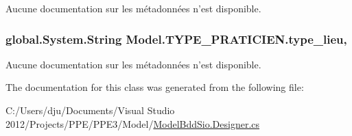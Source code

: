 Aucune documentation sur les métadonnées n'est disponible. 

\hypertarget{class_model_1_1_t_y_p_e___p_r_a_t_i_c_i_e_n_a1763dc779611fa8988840c66d8097bbb}{
\subsubsection[{type\-\_\-lieu}]{\setlength{\rightskip}{0pt plus 5cm}global.\-System.\-String Model.\-T\-Y\-P\-E\-\_\-\-P\-R\-A\-T\-I\-C\-I\-E\-N.\-type\-\_\-lieu\hspace{0.3cm}{\ttfamily [get]}, {\ttfamily [set]}}}\label{class_model_1_1_t_y_p_e___p_r_a_t_i_c_i_e_n_a1763dc779611fa8988840c66d8097bbb}


Aucune documentation sur les métadonnées n'est disponible. 



The documentation for this class was generated from the following file\-:\begin{DoxyCompactItemize}
\item 
C\-:/\-Users/dju/\-Documents/\-Visual Studio 2012/\-Projects/\-P\-P\-E/\-P\-P\-E3/\-Model/\hyperlink{_model_bdd_sio_8_designer_8cs}{Model\-Bdd\-Sio.\-Designer.\-cs}\end{DoxyCompactItemize}
